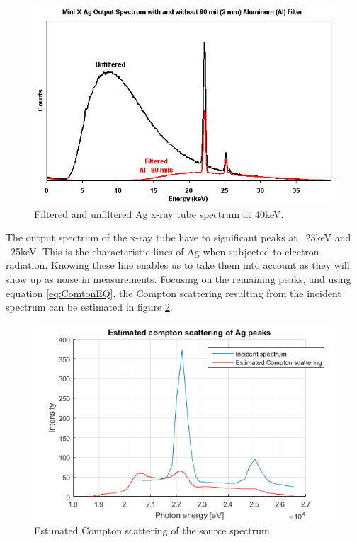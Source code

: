 \begin{figure}[h]
	\centering
	\includegraphics[width=\textwidth]{figures/XRF/minix_Fil.png}
	\caption{Filtered and unfiltered Ag x-ray tube spectrum at 40keV. \citep{AmptekSource}}
	\label{fig:AgSpectraFilt}
\end{figure}


The output spectrum of the x-ray tube have to significant peaks at ~23keV and ~25keV. This is the characteristic lines of Ag when subjected to electron radiation. Knowing these line enables us to take them into account as they will show up as noise in measurements. Focusing on the remaining peaks, and using equation \ref{eq:ComtonEQ}, the Compton scattering resulting from the incident spectrum can be estimated in figure \ref{fig:AgSpectraCompton}.

\begin{figure}[h]
	\centering
	\includegraphics[width=\textwidth]{figures/XRF/estComptonAgPeaks.png}
	\caption{Estimated Compton scattering of the source spectrum.}
	\label{fig:AgSpectraCompton}
\end{figure}

